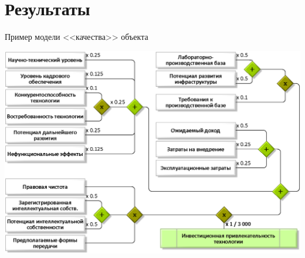  
\section{Результаты}
\begin{frame}{Пример модели <<качества>> объекта}
	\begin{center}
		\includegraphics[width=0.85\linewidth]{./pic/schemeF2}
	\end{center}
\end{frame} %

